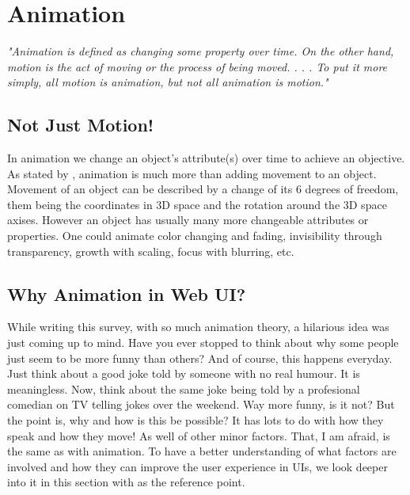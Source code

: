 %
%
% 
% 
% 


\chapter{Animation}

\label{chap:Animation}

{\em"Animation is defined as changing some property over time. On the other hand, motion is the act of moving or the process of being moved. . . .  To put it more simply, all motion is animation, but not all animation is motion."}\citep{head2016designing}

\section{Not Just Motion!} %
\label{sec:anime_motion}

In animation we change an object’s attribute(s) over time to achieve an objective. As stated by \citet{head2016designing}, animation is much more than adding movement to an object. Movement of an object can be described by a change of its 6 degrees of freedom, them being the coordinates in 3D space and the rotation around the 3D space axises. However an object has usually many more changeable attributes or properties. One could animate color changing and fading, invisibility through transparency, growth with scaling, focus with blurring, etc.

\section{Why Animation in Web UI?} %
\label{sec:anime_why}

While writing this survey, with so much animation theory, a hilarious idea was just coming up to mind. Have you ever stopped to think about why some people just seem to be more funny than others? And of course, this happens everyday. Just think about a good joke told by someone with no real humour. It is meaningless. Now, think about the same joke being told by a profesional comedian on TV telling jokes over the weekend. Way more funny, is it not? But the point is, why and how is this be possible?
It has lots to do with how they speak and how they move! As well of other minor factors. That, I am afraid, is the same as with animation. To have a better understanding of what factors are involved and how they can improve the user experience in UIs, we look deeper into it in this section with \citet{head2016designing} as the reference point.

